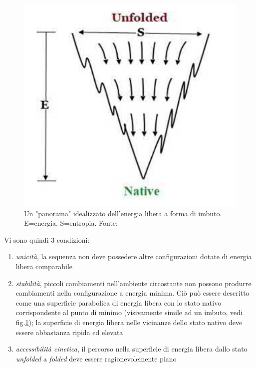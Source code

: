 \begin{figure}[h]
	\centering
	\includegraphics[scale=0.3]{images/funnel-folding.png}
	\caption{Un "panorama" idealizzato dell'energia libera a forma di imbuto. E=energia, S=entropia. Fonte: \cite{pal2019fundamentals}}
	\label{fig:funnel}
\end{figure}

Vi sono quindi 3 condizioni:

\begin{enumerate}
	\item \textit{unicità}, la sequenza non deve possedere altre configurazioni dotate di energia libera comparabile
	\item \textit{stabilità}, piccoli cambiamenti nell'ambiente circostante non possono produrre cambiamenti nella configurazione a energia minima. Ciò può essere descritto come una superficie parabolica di energia libera con lo stato nativo corrispondente al punto di minimo (visivamente simile ad un imbuto, vedi fig.\ref{fig:funnel}); la superficie di energia libera nelle vicinanze dello stato nativo deve essere abbastanza ripida ed elevata
	\item \textit{accessibilità cinetica}, il percorso nella superficie di energia libera dallo stato \textit{unfolded} a \textit{folded} deve essere ragionevolemente piano
\end{enumerate}


